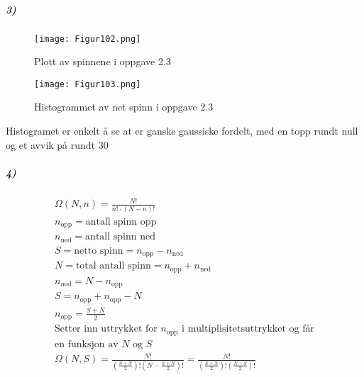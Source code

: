 \documentclass[11pt, A4paper,norsk]{article}
\begin{document}
			\subparagraph{3)}
				\begin{figure}
\texttt{[image: Figur102.png]}
\caption{Plott av spinnene i oppgave 2.3}
				\end{figure}
				\begin{figure}
\texttt{[image: Figur103.png]}
\caption{Histogrammet av net spinn i oppgave 2.3}
				\end{figure}

				\begin{flushleft}
Histogramet er enkelt å se at er ganske gaussiske fordelt, med en topp rundt null og et avvik på rundt $30$
				\end{flushleft}














			\subparagraph{4)}
				\begin{gather*}
\Omega(N, n) = \frac{N!}{n! \cdot (N - n)!} \\
n_{\text{opp}} = \text{antall spinn opp} \\
n_{\text{ned}} = \text{antall spinn ned} \\
S = \text{netto spinn} = n_{\text{opp}} - n_{\text{ned}} \\
N = \text{total antall spinn} = n_{\text{opp}} + n_{\text{ned}} \\
n_{\text{ned}} = N - n_{\text{opp}} \\
S = n_{\text{opp}} + n_{\text{opp}} - N \\
n_{\text{opp}} = \frac{S + N}{2} \\
\text{Setter inn uttrykket for $n_{\text{opp}}$ i multiplisitetsuttrykket og får} \\ 
\text{en funksjon av $N$ og $S$} \\
\Omega(N, S) = \frac{N!}{\left( \frac{S + N}{2} \right)! \left( N - \frac{S + N}{2} \right)!} = \frac{N!}{\left( \frac{S + N}{2} \right)! \left( \frac{N - S}{2} \right)!}
				\end{gather*}
\end{document}
